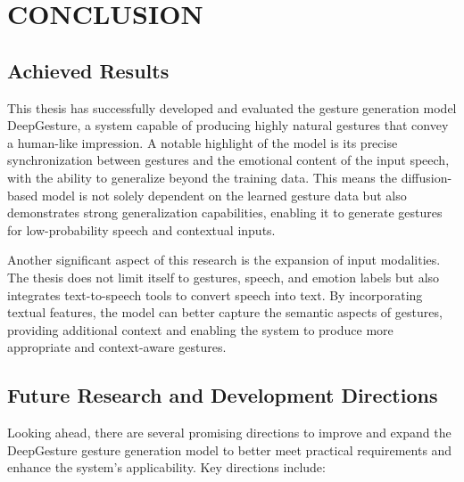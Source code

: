 \section{CONCLUSION}
\label{sec:conclusion}



\subsection{Achieved Results}

This thesis has successfully developed and evaluated the gesture generation model DeepGesture, a system capable of producing highly natural gestures that convey a human-like impression. A notable highlight of the model is its precise synchronization between gestures and the emotional content of the input speech, with the ability to generalize beyond the training data. This means the diffusion-based model is not solely dependent on the learned gesture data but also demonstrates strong generalization capabilities, enabling it to generate gestures for low-probability speech and contextual inputs.

Another significant aspect of this research is the expansion of input modalities. The thesis does not limit itself to gestures, speech, and emotion labels but also integrates text-to-speech tools to convert speech into text. By incorporating textual features, the model can better capture the semantic aspects of gestures, providing additional context and enabling the system to produce more appropriate and context-aware gestures.


\subsection{Future Research and Development Directions}

Looking ahead, there are several promising directions to improve and expand the DeepGesture gesture generation model to better meet practical requirements and enhance the system’s applicability. Key directions include:

